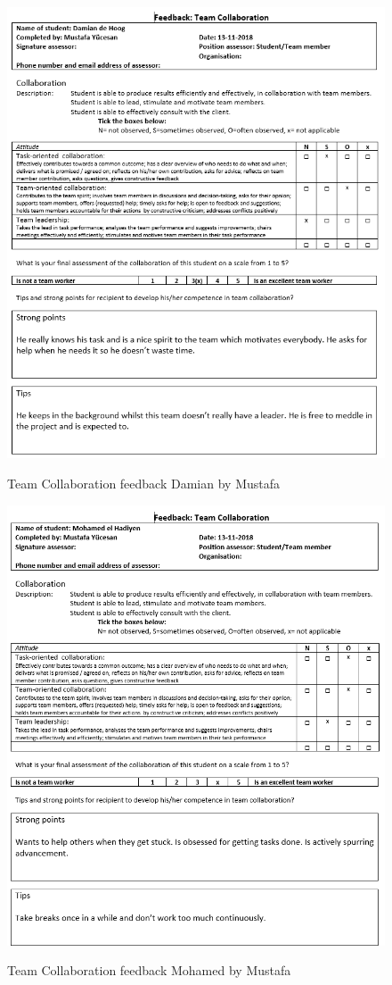 \documentclass[12pt]{article}
\begin{document}
	\begin{figure}[p!]
		\centering
		\includegraphics[width=\columnwidth]{CoopDamian2.PNG}\\
		\caption{Team Collaboration feedback Damian by Mustafa}
	\end{figure}
	\begin{figure}[p!]
		\centering
		\includegraphics[width=\columnwidth]{CoopMohamed2.PNG}\\
		\caption{Team Collaboration feedback Mohamed by Mustafa}
	\end{figure}
\end{document}
